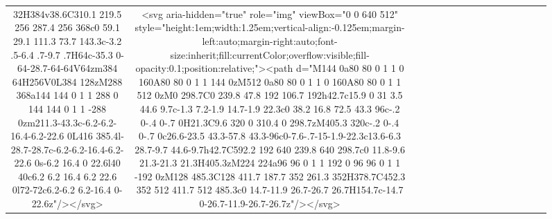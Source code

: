 \documentclass[
]{article}
\begin{document}
\begin{figure*}
\begin{longtable*}{cclllccccccccccl}
32H384v38.6C310.1 219.5 256 287.4 256 368c0 59.1 29.1 111.3 73.7 143.3c-3.2 .5-6.4 .7-9.7 .7H64c-35.3 0-64-28.7-64-64V64zm384 64H256V0L384 128zM288 368a144 144 0 1 1 288 0 144 144 0 1 1 -288 0zm211.3-43.3c-6.2-6.2-16.4-6.2-22.6 0L416 385.4l-28.7-28.7c-6.2-6.2-16.4-6.2-22.6 0s-6.2 16.4 0 22.6l40 40c6.2 6.2 16.4 6.2 22.6 0l72-72c6.2-6.2 6.2-16.4 0-22.6z"/></svg> & <svg aria-hidden="true" role="img" viewBox="0 0 640 512" style="height:1em;width:1.25em;vertical-align:-0.125em;margin-left:auto;margin-right:auto;font-size:inherit;fill:currentColor;overflow:visible;fill-opacity:0.1;position:relative;"><path d="M144 0a80 80 0 1 1 0 160A80 80 0 1 1 144 0zM512 0a80 80 0 1 1 0 160A80 80 0 1 1 512 0zM0 298.7C0 239.8 47.8 192 106.7 192h42.7c15.9 0 31 3.5 44.6 9.7c-1.3 7.2-1.9 14.7-1.9 22.3c0 38.2 16.8 72.5 43.3 96c-.2 0-.4 0-.7 0H21.3C9.6 320 0 310.4 0 298.7zM405.3 320c-.2 0-.4 0-.7 0c26.6-23.5 43.3-57.8 43.3-96c0-7.6-.7-15-1.9-22.3c13.6-6.3 28.7-9.7 44.6-9.7h42.7C592.2 192 640 239.8 640 298.7c0 11.8-9.6 21.3-21.3 21.3H405.3zM224 224a96 96 0 1 1 192 0 96 96 0 1 1 -192 0zM128 485.3C128 411.7 187.7 352 261.3 352H378.7C452.3 352 512 411.7 512 485.3c0 14.7-11.9 26.7-26.7 26.7H154.7c-14.7 0-26.7-11.9-26.7-26.7z"/></svg> &  \\ 

\end{longtable*}
\end{figure*}
\end{document}
